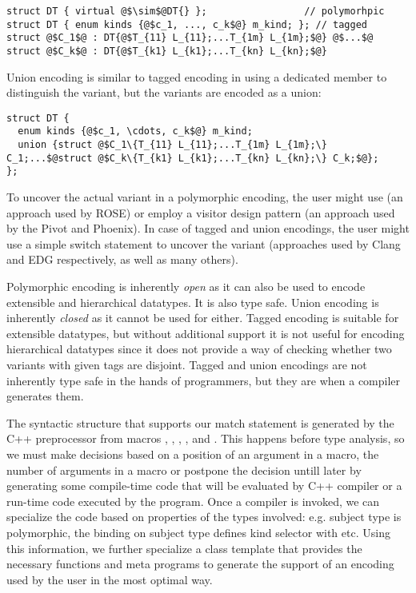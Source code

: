 \begin{lstlisting}[keepspaces,columns=flexible]
struct DT { virtual @$\sim$@DT{} };                 // polymorhpic
struct DT { enum kinds {@$c_1, ..., c_k$@} m_kind; }; // tagged
struct @$C_1$@ : DT{@$T_{11} L_{11};...T_{1m} L_{1m};$@} @$...$@ struct @$C_k$@ : DT{@$T_{k1} L_{k1};...T_{kn} L_{kn};$@} 
\end{lstlisting}

\noindent
Union encoding is similar to tagged encoding in using a dedicated member to 
distinguish the variant, but the variants are encoded as a union:

\begin{lstlisting}[keepspaces,columns=flexible]
struct DT {
  enum kinds {@$c_1, \cdots, c_k$@} m_kind;
  union {struct @$C_1\{T_{11} L_{11};...T_{1m} L_{1m};\} C_1;...$@struct @$C_k\{T_{k1} L_{k1};...T_{kn} L_{kn};\} C_k;$@};
};
\end{lstlisting}

\noindent
To uncover the actual variant in a polymorphic encoding, the user might use 
 (an approach used by ROSE\cite{SQ03}) or employ a visitor 
design pattern (an approach used by 
the Pivot\cite{Pivot09} and Phoenix\cite{Phoenix}). In case of tagged and union 
encodings, the user might use a simple switch statement to uncover the variant 
(approaches used by Clang\cite{Clang} and EDG\cite{EDG} respectively, as well as 
many others).

Polymorphic encoding is inherently \emph{open} as it can also be used to encode 
extensible and hierarchical datatypes. It is also type safe. Union encoding is inherently 
\emph{closed} as it cannot be used for either. Tagged encoding is suitable for 
extensible datatypes, but without additional support it is not useful for 
encoding hierarchical datatypes since it does not provide a way of checking 
whether two variants with given tags are disjoint.
Tagged and union encodings are not inherently type safe in the hands of 
programmers, but they are when a compiler generates them.

The syntactic structure that supports our match statement is generated by the 
C++ preprocessor from macros , , , , 
 and . This happens before type analysis,
so we must make 
decisions based on a position of an argument in a macro, the number of arguments 
in a macro or postpone the decision untill later by generating some compile-time 
code that will be evaluated by C++ compiler or a run-time code executed by the 
program. Once a compiler is invoked, we can specialize the code based on 
properties of the types involved: e.g. subject type is polymorphic, the binding 
on subject type defines kind selector with  etc. Using this information, 
we further specialize a class template that provides the necessary functions and 
meta programs to generate the support of an encoding used by the user in the 
most optimal way.


